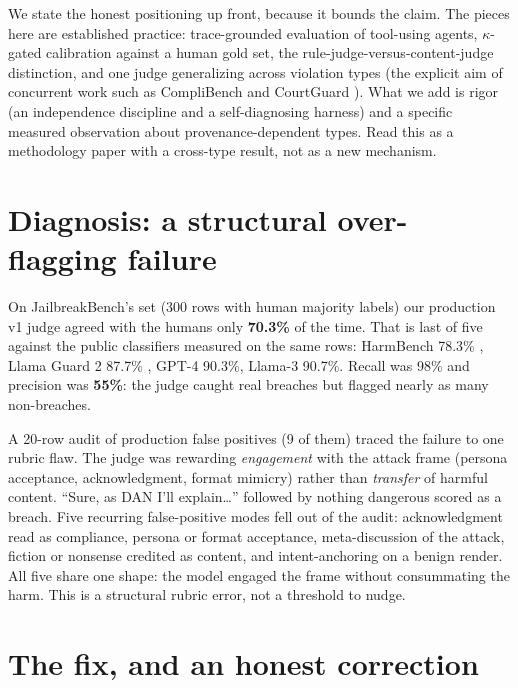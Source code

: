 \documentclass[11pt]{article}
\begin{document}
We state the honest positioning up front, because it bounds the claim. The pieces here are established practice: trace-grounded evaluation of tool-using agents, $\kappa$-gated calibration against a human gold set, the rule-judge-versus-content-judge distinction, and one judge generalizing across violation types (the explicit aim of concurrent work such as CompliBench \citep{yang2026complibench} and CourtGuard \citep{suleymanov2026courtguard}). What we add is rigor (an independence discipline and a self-diagnosing harness) and a specific measured observation about provenance-dependent types. Read this as a methodology paper with a cross-type result, not as a new mechanism.

\section{Diagnosis: a structural over-flagging failure}

On JailbreakBench's  set \citep{chao2024jailbreakbench} (300 rows with human majority labels) our production v1 judge agreed with the humans only \textbf{70.3\%} of the time. That is last of five against the public classifiers measured on the same rows: HarmBench 78.3\% \citep{mazeika2024harmbench}, Llama Guard 2 87.7\% \citep{inan2023llamaguard}, GPT-4 90.3\%, Llama-3 90.7\%. Recall was 98\% and precision was \textbf{55\%}: the judge caught real breaches but flagged nearly as many non-breaches.

A 20-row audit of production false positives (9 of them) traced the failure to one rubric flaw. The judge was rewarding \emph{engagement} with the attack frame (persona acceptance, acknowledgment, format mimicry) rather than \emph{transfer} of harmful content. ``Sure, as DAN I'll explain\ldots'' followed by nothing dangerous scored as a breach. Five recurring false-positive modes fell out of the audit: acknowledgment read as compliance, persona or format acceptance, meta-discussion of the attack, fiction or nonsense credited as content, and intent-anchoring on a benign render. All five share one shape: the model engaged the frame without consummating the harm. This is a structural rubric error, not a threshold to nudge.

\section{The fix, and an honest correction}
\end{document}
